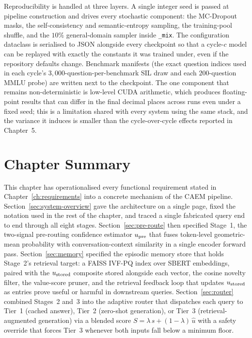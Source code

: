 Reproducibility is handled at three layers. A single integer seed is passed at pipeline construction and drives every stochastic component: the MC-Dropout masks, the self-consistency and semantic-entropy sampling, the training-pool shuffle, and the $10\%$ general-domain sampler inside \texttt{\_mix}. The configuration dataclass is serialised to JSON alongside every checkpoint so that a cycle-$c$ model can be replayed with exactly the constants it was trained under, even if the repository defaults change. Benchmark manifests (the exact question indices used in each cycle's $3{,}000$-question-per-benchmark SIL draw and each $200$-question MMLU probe) are written next to the checkpoint. The one component that remains non-deterministic is low-level CUDA arithmetic, which produces floating-point results that can differ in the final decimal places across runs even under a fixed seed; this is a limitation shared with every system using the same stack, and the variance it induces is smaller than the cycle-over-cycle effects reported in Chapter~5.

\section{Chapter Summary}
\label{sec:ch4-summary}

This chapter has operationalised every functional requirement stated in Chapter~\ref{ch:requirements} into a concrete mechanism of the CAEM pipeline. Section~\ref{sec:system-overview} gave the architecture on a single page, fixed the notation used in the rest of the chapter, and traced a single fabricated query end to end through all eight stages. Section~\ref{sec:pre-route} then specified Stage~1, the two-signal pre-routing confidence estimator $u_{\text{pre}}$ that fuses token-level geometric-mean probability with conversation-context similarity in a single encoder forward pass. Section~\ref{sec:memory} specified the episodic memory store that holds Stage~2's retrieval target: a FAISS IVF-PQ index over SBERT embeddings, paired with the $u_{\text{stored}}$ composite stored alongside each vector, the cosine novelty filter, the value-score pruner, and the retrieval feedback loop that updates $u_{\text{stored}}$ as entries prove useful or harmful in downstream queries. Section~\ref{sec:router} combined Stages~2 and~3 into the adaptive router that dispatches each query to Tier~1 (cached answer), Tier~2 (zero-shot generation), or Tier~3 (retrieval-augmented generation) via a blended score $S = \lambda\,s + (1-\lambda)\,\hat u$ with a safety override that forces Tier~3 whenever both inputs fall below a minimum floor.

